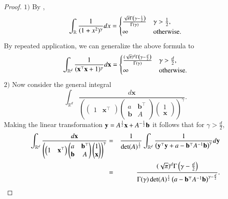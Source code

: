 \documentclass[12pt]{article}
\newcommand{\R}{\mathbb{R}}
\theoremstyle{plain}
\theoremstyle{definition}
\theoremstyle{remark}
\begin{document}
\begin{proof}
\noindent \(1)\) By \cite[page 16]{diaconis2008},
\[
\int_{\mathbb{R}} \frac{1}{(1 + x^2)^\gamma} dx = \begin{cases}
\frac{\sqrt{\pi} \Gamma \left( \gamma - \frac{1}{2} \right)}{\Gamma(\gamma)} &
\gamma > \frac{1}{2}, \cr
\infty & \mbox{otherwise}.
\end{cases}
\]
\noindent
By repeated application, we can generalize the above formula to
\[
\int_{\mathbb{R}^d} \frac{1}{({\bf x}^{\top} {\bf x} + 1)^\gamma} d {\bf x} = \begin{cases}
\frac{(\sqrt{\pi})^d \Gamma \left( \gamma - \frac{d}{2} \right)}{\Gamma(\gamma)} & \gamma
> \frac{d}{2}, \cr
\infty & \mbox{otherwise}.
\end{cases}
\]
\noindent \(2)\) Now consider the general integral
\[
	\int_{\R^d} \dfrac{d\mathbf{x}}{\left(\left(\begin{matrix}1& \mathbf{x}^{\top} \end{matrix}\right)\left(\begin{matrix} a  & \mathbf{b}^{\top}\\  \mathbf{b}&A\end{matrix}\right) \left(\begin{matrix} 1\\ \mathbf{x} \end{matrix}\right)\right)^{\gamma}} .
\]
\noindent
Making the linear transformation ${\bf y} = A^{\frac{1}{2}} {\bf x}
+ A^{-\frac{1}{2}}\mathbf{b}$ it follows that for $\gamma > \frac{d}{2}$,
\begin{eqnarray}
\int_{\R^d} \dfrac{d\mathbf{x}}{\left(\left(\begin{matrix}1& \mathbf{x}^{\top} \end{matrix}\right)\left(\begin{matrix} a  & \mathbf{b}^{\top}\\  \mathbf{b}&A\end{matrix}\right)\left(\begin{matrix} 1\\ \mathbf{x} \end{matrix}\right)\right)^{\gamma}}
&=& \frac{1}{\det(A)^{\frac{1}{2}}} \int_{\mathbb{R}^d} \dfrac{1}{\left( {\bf y}^{\top} {\bf y} +  a - \mathbf{b}^{\top} A^{-1}
\mathbf{b} \right)^\gamma} d {\bf y} \nonumber\\
&=& \dfrac{(\sqrt{\pi})^d \Gamma \left( \gamma - \frac{d}{2} \right)}{\Gamma(\gamma)
\det(A)^{\frac{1}{2}} \left( a - \mathbf{b}^{\top} A^{-1} \mathbf{b} \right)^{\gamma - \frac{d}{2}}}.
\label{intgltrnfm}
\end{eqnarray}

\end{proof}
\end{document}
